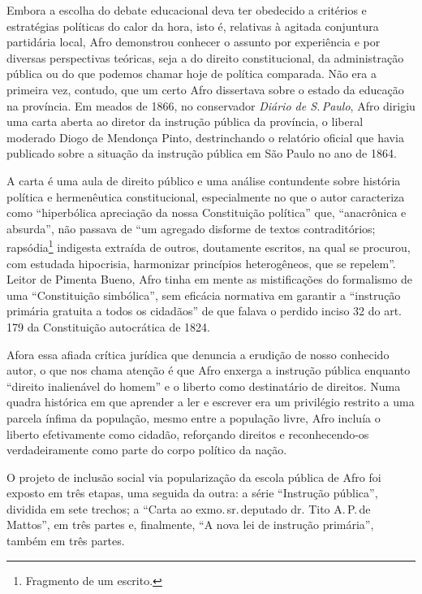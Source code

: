 Embora a escolha do debate educacional deva ter obedecido a critérios e
estratégias políticas do calor da hora, isto é, relativas à agitada
conjuntura partidária local, Afro demonstrou conhecer o assunto
por experiência e por diversas perspectivas teóricas, seja a do direito
constitucional, da administração pública ou do que podemos chamar hoje
de política comparada. Não era a primeira vez, contudo, que um certo
Afro dissertava sobre o estado da educação na província. Em
meados de 1866, no conservador \emph{Diário de S.\,Paulo}, Afro
dirigiu uma carta aberta ao diretor da instrução pública da província, o
liberal moderado Diogo de Mendonça Pinto, destrinchando o relatório
oficial que havia publicado sobre a situação da instrução pública em São
Paulo no ano de 1864.

A carta é uma aula de direito público e uma análise contundente sobre
história política e hermenêutica constitucional, especialmente no que o
autor caracteriza como ``hiperbólica apreciação da nossa Constituição
política'' que, ``anacrônica e absurda'', não passava de ``um agregado
disforme de textos contraditórios; rapsódia\footnote{Fragmento de um
  escrito.} indigesta extraída de outros, doutamente escritos, na qual
se procurou, com estudada hipocrisia, harmonizar princípios
heterogêneos, que se repelem''. Leitor de Pimenta Bueno, Afro
tinha em mente as mistificações do formalismo de uma ``Constituição
simbólica'', sem eficácia normativa em garantir a ``instrução primária
gratuita a todos os cidadãos'' de que falava o perdido inciso 32 do art.
179 da Constituição autocrática de 1824.

Afora essa afiada crítica jurídica que denuncia a erudição de nosso
conhecido autor, o que nos chama atenção é que Afro enxerga a
instrução pública enquanto ``direito inalienável do homem'' e o liberto
como destinatário de direitos. Numa quadra histórica em que aprender a
ler e escrever era um privilégio restrito a uma parcela ínfima da
população, mesmo entre a população livre, Afro incluía o liberto
efetivamente como cidadão, reforçando direitos e reconhecendo-os
verdadeiramente como parte do corpo político da nação.

O projeto de inclusão social via popularização da escola pública de
Afro foi exposto em três etapas, uma seguida da outra: a série
``Instrução pública'', dividida em sete trechos; a ``Carta ao
exmo.\,sr.\,deputado dr. Tito A.\,P.\,de Mattos'', em três partes e,
finalmente, ``A nova lei de instrução primária'', também em três
partes.


